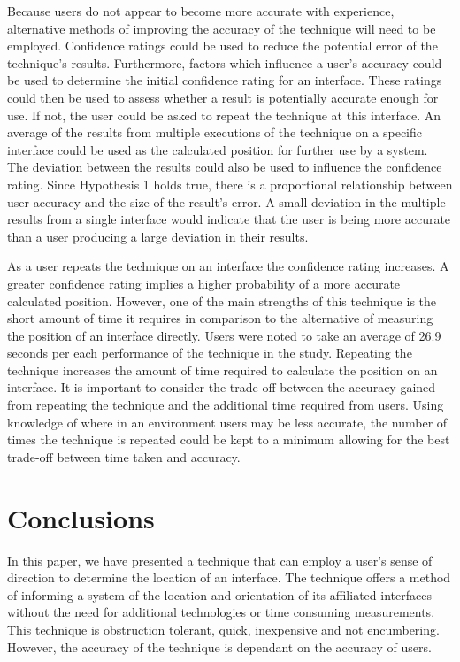 \documentclass{bmcart}
\begin{document}
Because users do not appear to become more accurate with experience, alternative methods of improving the accuracy of the technique will need to be employed.
Confidence ratings could be used to reduce the potential error of the technique's results.
Furthermore, factors which influence a user's accuracy could be used to determine the initial confidence rating for an interface.
These ratings could then be used to assess whether a result is potentially accurate enough for use.
If not, the user could be asked to repeat the technique at this interface.
An average of the results from multiple executions of the technique on a specific interface could be used as the calculated position for further use by a system.
The deviation between the results could also be used to influence the confidence rating.
Since Hypothesis 1 holds true, there is a proportional relationship between user accuracy and the size of the result's error.
A small deviation in the multiple results from a single interface would indicate that the user is being more accurate than a user producing a large deviation in their results.

As a user repeats the technique on an interface the confidence rating increases.
A greater confidence rating implies a higher probability of a more accurate calculated position.
However, one of the main strengths of this technique is the short amount of time it requires in comparison to the alternative of measuring the position of an interface directly.
Users were noted to take an average of 26.9 seconds per each performance of the technique in the study.
Repeating the technique increases the amount of time required to calculate the position on an interface.
It is important to consider the trade-off between the accuracy gained from repeating the technique and the additional time required from users.
Using knowledge of where in an environment users may be less accurate, the number of times the technique is repeated could be kept to a minimum allowing for the best trade-off between time taken and accuracy.


\section*{Conclusions}\label{sec:conclusion}

In this paper, we have presented a technique that can employ a user's sense of direction to determine the location of an interface.
The technique offers a method of informing a system of the location and orientation of its affiliated interfaces without the need for additional technologies or time consuming measurements. 
This technique is obstruction tolerant, quick, inexpensive and not encumbering.
However, the accuracy of the technique is dependant on the accuracy of users.
\end{document}
